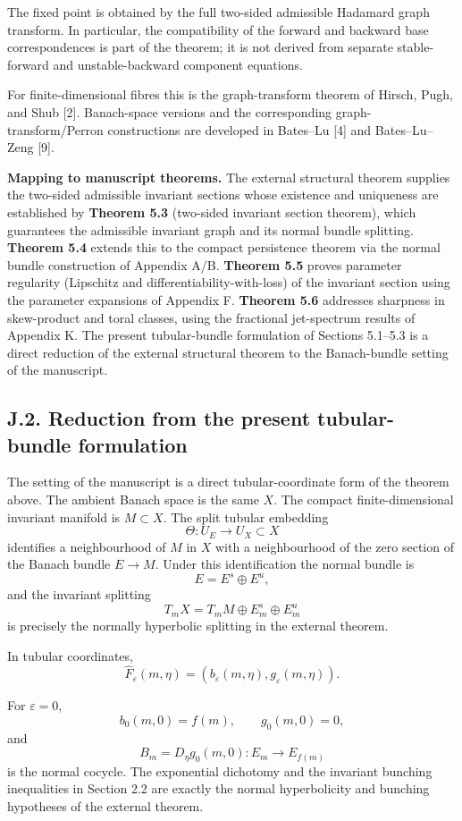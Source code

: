 \documentclass[12pt,a4paper]{article}
\theoremstyle{plain}
\numberwithin{equation}{section}
\numberwithin{theorem}{section}
\begin{document}
The fixed point is obtained by the full two-sided admissible Hadamard graph transform. In particular, the compatibility of the forward and backward base correspondences is part of the theorem; it is not derived from separate stable-forward and unstable-backward component equations.

For finite-dimensional fibres this is the graph-transform theorem of Hirsch, Pugh, and Shub [2]. Banach-space versions and the corresponding graph-transform/Perron constructions are developed in Bates--Lu [4] and Bates--Lu--Zeng [9].

\textbf{Mapping to manuscript theorems.} The external structural theorem supplies the two-sided admissible invariant sections whose existence and uniqueness are established by \textbf{Theorem 5.3} (two-sided invariant section theorem), which guarantees the admissible invariant graph and its normal bundle splitting. \textbf{Theorem 5.4} extends this to the compact persistence theorem via the normal bundle construction of Appendix A/B. \textbf{Theorem 5.5} proves parameter regularity (Lipschitz and differentiability-with-loss) of the invariant section using the parameter expansions of Appendix F. \textbf{Theorem 5.6} addresses sharpness in skew-product and toral classes, using the fractional jet-spectrum results of Appendix K. The present tubular-bundle formulation of Sections 5.1--5.3 is a direct reduction of the external structural theorem to the Banach-bundle setting of the manuscript.

\subsection{J.2. Reduction from the present tubular-bundle formulation}

The setting of the manuscript is a direct tubular-coordinate form of the theorem above. The ambient Banach space is the same $X$. The compact finite-dimensional invariant manifold is $M\subset X$. The split tubular embedding
\[
\Theta:U_E\to U_X\subset X
\]
identifies a neighbourhood of $M$ in $X$ with a neighbourhood of the zero section of the Banach bundle $E\to M$. Under this identification the normal bundle is
\[
E=E^s\oplus E^u,
\]
and the invariant splitting
\[
T_mX=T_mM\oplus E_m^s\oplus E_m^u
\]
is precisely the normally hyperbolic splitting in the external theorem.

In tubular coordinates,
\[
\widehat F_\varepsilon(m,\eta)
=
(b_\varepsilon(m,\eta),g_\varepsilon(m,\eta)).
\]

For $\varepsilon=0$,
\[
b_0(m,0)=f(m),
\qquad
 g_0(m,0)=0,
\]
and
\[
B_m=D_\eta g_0(m,0):E_m\to E_{f(m)}
\]
is the normal cocycle. The exponential dichotomy and the invariant bunching inequalities in Section 2.2 are exactly the normal hyperbolicity and bunching hypotheses of the external theorem.
\end{document}
